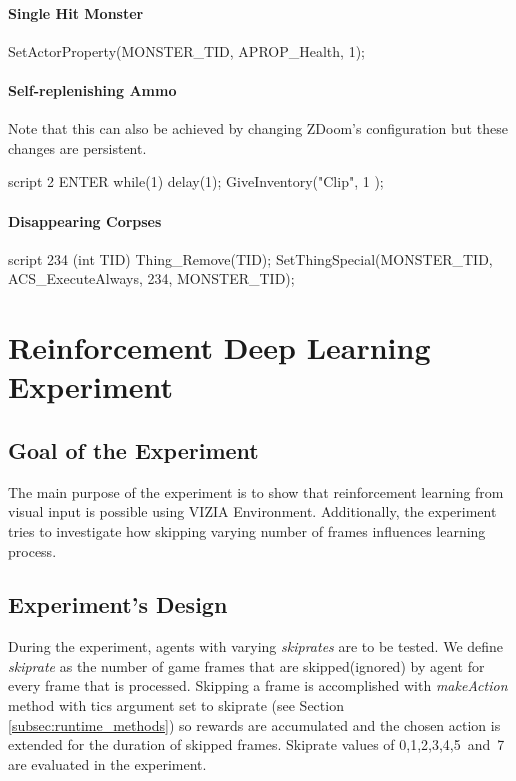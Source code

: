 \documentclass[english,bachelor,a4paper,twoside]{ppfcmthesis}
\begin{document}
		\subsubsection*{Single Hit Monster}
			\begin{clinee}
SetActorProperty(MONSTER_TID, APROP_Health, 1);
			\end{clinee}
		\subsubsection*{Self-replenishing Ammo}
		Note that this can also be achieved by changing ZDoom's configuration but these changes are persistent.
			\begin{clinee}
script 2 ENTER
{   
    while(1)
    {
        delay(1);
        GiveInventory("Clip", 1 );
    }
}
			\end{clinee}
		\subsubsection*{Disappearing Corpses}
			\begin{clinee}
script 234 (int TID)
{
	Thing_Remove(TID);
}
SetThingSpecial(MONSTER_TID, ACS_ExecuteAlways, 234, MONSTER_TID);
			\end{clinee}
\chapter{Reinforcement Deep Learning Experiment}\label{ch:experiment}

\section{Goal of the Experiment}
The main purpose of the experiment is to show that reinforcement learning from visual input is possible using VIZIA Environment. 	
Additionally, the experiment tries to investigate how skipping varying number of frames influences learning process.

\section{Experiment's Design}
During the experiment, agents with varying \emph{skiprates} are to be tested. We define \emph{skiprate} as the number of game frames that are skipped(ignored) by agent for every frame that is processed. Skipping a frame is accomplished with \emph{makeAction} method with tics argument set to skiprate (see Section \ref{subsec:runtime_methods}) so rewards are accumulated and the chosen action is extended for the duration of skipped frames. Skiprate values of 0,1,2,3,4,5~and~7 are evaluated in the experiment. 
\end{document}
